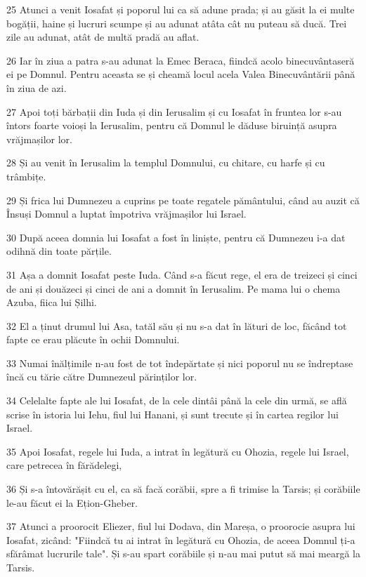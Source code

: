 \par 25 Atunci a venit Iosafat și poporul lui ca să adune prada; și au găsit la ei multe bogății, haine și lucruri scumpe și au adunat atâta cât nu puteau să ducă. Trei zile au adunat, atât de multă pradă au aflat.
\par 26 Iar în ziua a patra s-au adunat la Emec Beraca, fiindcă acolo binecuvântaseră ei pe Domnul. Pentru aceasta se și cheamă locul acela Valea Binecuvântării până în ziua de azi.
\par 27 Apoi toți bărbații din Iuda și din Ierusalim și cu Iosafat în fruntea lor s-au întors foarte voioși la Ierusalim, pentru că Domnul le dăduse biruință asupra vrăjmașilor lor.
\par 28 Și au venit în Ierusalim la templul Domnului, cu chitare, cu harfe și cu trâmbițe.
\par 29 Și frica lui Dumnezeu a cuprins pe toate regatele pământului, când au auzit că Însuși Domnul a luptat împotriva vrăjmașilor lui Israel.
\par 30 După aceea domnia lui Iosafat a fost în liniște, pentru că Dumnezeu i-a dat odihnă din toate părțile.
\par 31 Așa a domnit Iosafat peste Iuda. Când s-a făcut rege, el era de treizeci și cinci de ani și douăzeci și cinci de ani a domnit în Ierusalim. Pe mama lui o chema Azuba, fiica lui Șilhi.
\par 32 El a ținut drumul lui Asa, tatăl său și nu s-a dat în lături de loc, făcând tot fapte ce erau plăcute în ochii Domnului.
\par 33 Numai înălțimile n-au fost de tot îndepărtate și nici poporul nu se îndreptase încă cu tărie către Dumnezeul părinților lor.
\par 34 Celelalte fapte ale lui Iosafat, de la cele dintâi până la cele din urmă, se află scrise în istoria lui Iehu, fiul lui Hanani, și sunt trecute și în cartea regilor lui Israel.
\par 35 Apoi Iosafat, regele lui Iuda, a intrat în legătură cu Ohozia, regele lui Israel, care petrecea în fărădelegi,
\par 36 Și s-a întovărășit cu el, ca să facă corăbii, spre a fi trimise la Tarsis; și corăbiile le-au făcut ei la Ețion-Gheber.
\par 37 Atunci a proorocit Eliezer, fiul lui Dodava, din Mareșa, o proorocie asupra lui Iosafat, zicând: "Fiindcă tu ai intrat în legătură cu Ohozia, de aceea Domnul ți-a sfărâmat lucrurile tale". Și s-au spart corăbiile și n-au mai putut să mai meargă la Tarsis.

